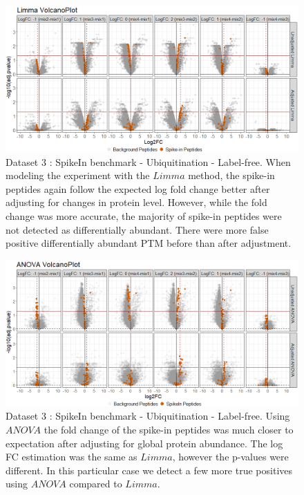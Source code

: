 \documentclass{mcp}
\begin{document}
\begin{figure}[h!]
\centering
\includegraphics[width=1\textwidth]{sim_new/SuppFigure4.png}
\caption{Dataset 3 : SpikeIn benchmark - Ubiquitination - Label-free. When modeling the experiment with the $Limma$ method, the spike-in peptides again follow the expected log fold change better after adjusting for changes in protein level. However, while the fold change was more accurate, the majority of spike-in peptides were not detected as differentially abundant. There were more false positive differentially abundant PTM before than after adjustment. \label{fig:spike_volcano_limma}}
\end{figure}

\begin{figure}[h!]
\centering
\includegraphics[width=1\textwidth]{sim_new/SuppFigure5.png}
\caption{Dataset 3 : SpikeIn benchmark - Ubiquitination - Label-free. Using $ANOVA$ the fold change of the spike-in peptides was much closer to expectation after adjusting for global protein abundance. The log FC estimation was the same as $Limma$, however the p-values were different. In this particular case we detect a few more true positives using $ANOVA$ compared to $Limma$.\label{fig:spike_volcano_ttest}}
\end{figure}
\end{document}
